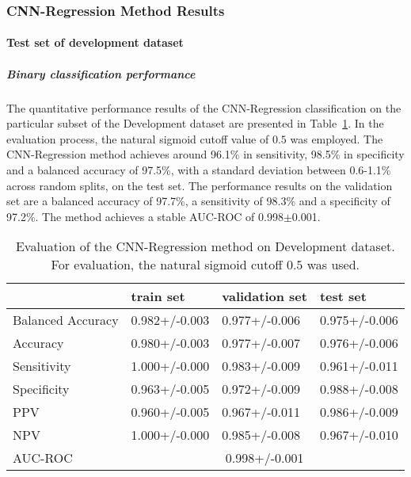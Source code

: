 \subsubsection{CNN-Regression Method Results}
\label{subsubsec:eval_regression}


\paragraph{Test set of development dataset}


\subparagraph{Binary classification performance}

The quantitative performance results of the CNN-Regression classification on the 
particular subset of the Development dataset are presented in Table~\ref{t1:cnn_regression_perf_eval_table}.
In the evaluation process, the natural sigmoid cutoff value of $0.5$ was employed.
The CNN-Regression method achieves around 96.1\% in sensitivity, 98.5\% in specificity and a balanced accuracy of 97.5\%, 
with a standard deviation between 0.6-1.1\% across random splits, on the test set.
The performance results on the validation set are a balanced accuracy of 97.7\%, a sensitivity of 98.3\% 
and a specificity of 97.2\%.
The method achieves a stable AUC-ROC of 0.998$\pm$0.001.


\begin{table}[ht]
  \caption{Evaluation of the CNN-Regression method on Development dataset. 
  For evaluation, the natural sigmoid cutoff $0.5$ was used.}
  \centering
  \begin{tabular}{llll}
      \hline
                        & train set         & validation set      & test set             \\
      \hline
      Balanced Accuracy & 0.982+/-0.003   &  0.977+/-0.006    &  0.975+/-0.006 \\
      Accuracy          & 0.980+/-0.003     &   0.977+/-0.007   &  0.976+/-0.006  \\
      Sensitivity       &  1.000+/-0.000   &   0.983+/-0.009   &  0.961+/-0.011 \\
      Specificity       &   0.963+/-0.005  &   0.972+/-0.009 &   0.988+/-0.008 \\
      PPV               &  0.960+/-0.005    &   0.967+/-0.011  &  0.986+/-0.009  \\
      NPV               &  1.000+/-0.000  &   0.985+/-0.008   & 0.967+/-0.010 \\
      \hline
      AUC-ROC          &  \multicolumn{3}{c}{0.998+/-0.001}  \\
      \hline
  \end{tabular}
 \label{t1:cnn_regression_perf_eval_table}
\end{table}


